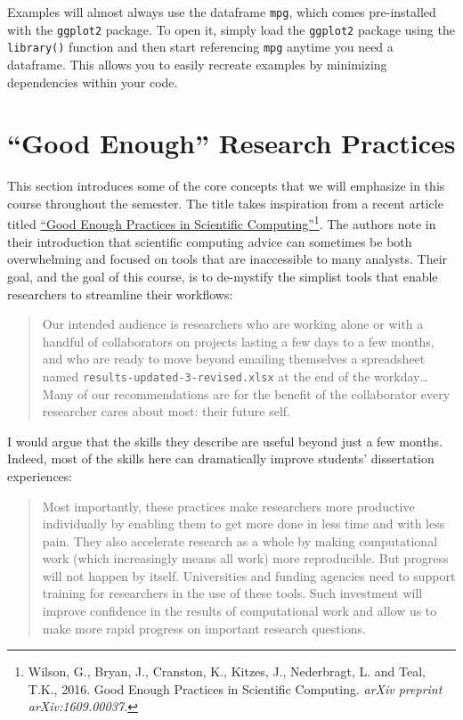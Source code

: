 \documentclass[]{book}
\let\rmarkdownfootnote\footnote%
\def\footnote{\protect\rmarkdownfootnote}
\theoremstyle{definition}
\theoremstyle{definition}
\theoremstyle{remark}
\begin{document}
Examples will almost always use the dataframe \texttt{mpg}, which comes
pre-installed with the \texttt{ggplot2} package. To open it, simply load
the \texttt{ggplot2} package using the \texttt{library()} function and
then start referencing \texttt{mpg} anytime you need a dataframe. This
allows you to easily recreate examples by minimizing dependencies within
your code.

\chapter{\texorpdfstring{``Good Enough'' Research
Practices}{Good Enough Research Practices}}\label{good-enough-research-practices}

This section introduces some of the core concepts that we will emphasize
in this course throughout the semester. The title takes inspiration from
a recent article titled \href{https://arxiv.org/abs/1609.00037}{``Good
Enough Practices in Scientific Computing''}\footnote{Wilson, G., Bryan,
  J., Cranston, K., Kitzes, J., Nederbragt, L. and Teal, T.K., 2016.
  Good Enough Practices in Scientific Computing. \emph{arXiv preprint
  arXiv:1609.00037.}}. The authors note in their introduction that
scientific computing advice can sometimes be both overwhelming and
focused on tools that are inaccessible to many analysts. Their goal, and
the goal of this course, is to de-mystify the simplist tools that enable
researchers to streamline their workflows:

\begin{quote}
Our intended audience is researchers who are working alone or with a
handful of collaborators on projects lasting a few days to a few months,
and who are ready to move beyond emailing themselves a spreadsheet named
\texttt{results-updated-3-revised.xlsx} at the end of the
workday\ldots{}Many of our recommendations are for the benefit of the
collaborator every researcher cares about most: their future self.
\end{quote}

I would argue that the skills they describe are useful beyond just a few
months. Indeed, most of the skills here can dramatically improve
students' dissertation experiences:

\begin{quote}
Most importantly, these practices make researchers more productive
individually by enabling them to get more done in less time and with
less pain. They also accelerate research as a whole by making
computational work (which increasingly means all work) more
reproducible. But progress will not happen by itself. Universities and
funding agencies need to support training for researchers in the use of
these tools. Such investment will improve confidence in the results of
computational work and allow us to make more rapid progress on important
research questions.
\end{quote}
\end{document}
